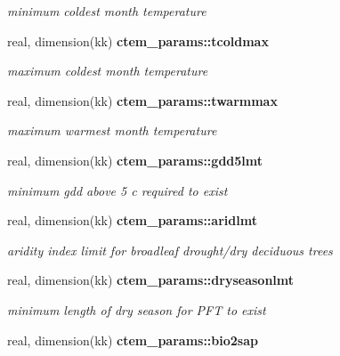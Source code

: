 \begin{DoxyCompactItemize}
\begin{DoxyCompactList}\small\item\em minimum coldest month temperature \end{DoxyCompactList}\item 
\hypertarget{namespacectem__params_a931982e7bbae83e4ebc020aef5e82785}{}real, dimension(kk) {\bfseries ctem\+\_\+params\+::tcoldmax}\label{namespacectem__params_a931982e7bbae83e4ebc020aef5e82785}

\begin{DoxyCompactList}\small\item\em maximum coldest month temperature \end{DoxyCompactList}\item 
\hypertarget{namespacectem__params_a72a50f8b26e68efe36fe078e192726b7}{}real, dimension(kk) {\bfseries ctem\+\_\+params\+::twarmmax}\label{namespacectem__params_a72a50f8b26e68efe36fe078e192726b7}

\begin{DoxyCompactList}\small\item\em maximum warmest month temperature \end{DoxyCompactList}\item 
\hypertarget{namespacectem__params_a6a7e5c14d01e4234fb7a0ee3fb795c34}{}real, dimension(kk) {\bfseries ctem\+\_\+params\+::gdd5lmt}\label{namespacectem__params_a6a7e5c14d01e4234fb7a0ee3fb795c34}

\begin{DoxyCompactList}\small\item\em minimum gdd above 5 c required to exist \end{DoxyCompactList}\item 
\hypertarget{namespacectem__params_a5fb0d8e073e3b32005845f96d7ee9eb5}{}real, dimension(kk) {\bfseries ctem\+\_\+params\+::aridlmt}\label{namespacectem__params_a5fb0d8e073e3b32005845f96d7ee9eb5}

\begin{DoxyCompactList}\small\item\em aridity index limit for broadleaf drought/dry deciduous trees \end{DoxyCompactList}\item 
\hypertarget{namespacectem__params_af24fc4b3d8a43b3a8660e97fb81bce30}{}real, dimension(kk) {\bfseries ctem\+\_\+params\+::dryseasonlmt}\label{namespacectem__params_af24fc4b3d8a43b3a8660e97fb81bce30}

\begin{DoxyCompactList}\small\item\em minimum length of dry season for P\+F\+T to exist \end{DoxyCompactList}\item 
\hypertarget{namespacectem__params_ad97be0dd9fb2c81974e6cb42433869ef}{}real, dimension(kk) {\bfseries ctem\+\_\+params\+::bio2sap}\label{namespacectem__params_ad97be0dd9fb2c81974e6cb42433869ef}


\end{DoxyCompactItemize}
